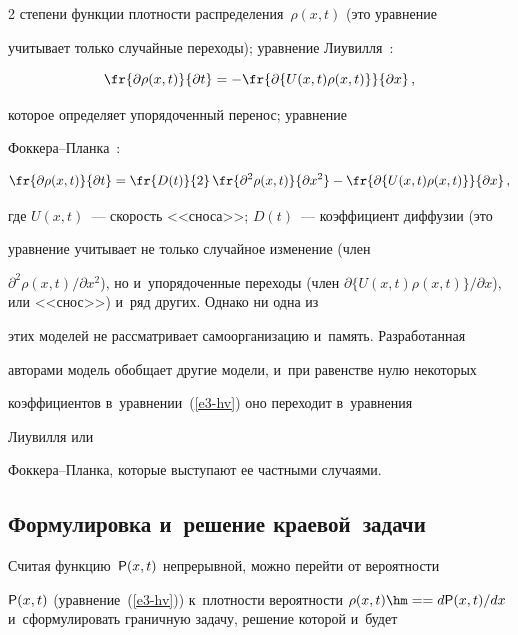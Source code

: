 \begin{multicols}{2}
степени функции плотности распределения~$\rho(x,t)$ (это уравнение 


учитывает только случайные переходы); уравнение Лиувилля~\cite{18-hv}: 


  $$


  \fr{\partial \rho(x,t)}{\partial t}=-\fr{\partial \{ U(x,t)\rho(x,t)\}}{\partial x}\,,


  $$


  которое определяет упорядоченный перенос; уравнение  


Фок\-ке\-ра--План\-ка~\cite{19-hv}: 


  $$


  \fr{\partial\rho(x,t)}{\partial t}=\fr{D(t)}{2}\,\fr{\partial^2\rho(x,t)}{\partial 


x^2} - \fr{\partial \{ U(x,t)\rho(x,t)\}}{\partial x}\,,


  $$


  где $U(x,t)$~--- скорость <<сноса>>; $D(t)$~--- коэффициент диффузии (это 


уравнение учитывает не только случайное изменение (член 


$\partial^2\rho(x,t)/\partial x^2$), но и~упорядоченные переходы (член $\partial 


\{ U(x,t)\rho(x,t)\}/\partial x$), или <<снос>>) и~ряд других. Однако ни одна из 


этих моделей не рассматривает самоорганизацию и~память. Разработанная 


авторами модель обобщает другие модели, и~при равенстве нулю некоторых 


коэффициентов в~уравнении~(\ref{e3-hv}) оно переходит в~уравнения 


Лиувилля или  


Фок\-ке\-ра--План\-ка, которые выступают ее частными случаями.


  


\subsection{Формулировка и~решение краевой~задачи}





  Считая функцию~${\sf P}(x,t)$ непрерывной, можно перейти от вероятности 


${\sf P}(x,t)$ (уравнение~(\ref{e3-hv})) к~плотности вероятности $\rho(x,t)\hm= 


=d{\sf P}(x,t)/dx$ и~сформулировать граничную задачу, решение которой и~будет 



\end{multicols}
